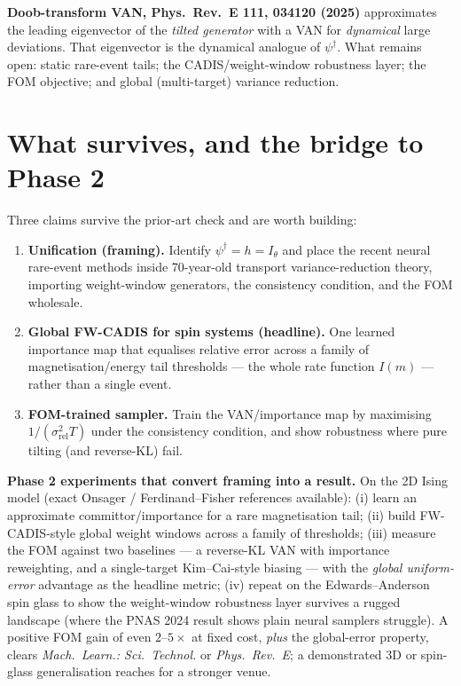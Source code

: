 \documentclass[11pt]{article}
\newcommand{\dg}{^{\dagger}}
\begin{document}
\smallskip
\noindent\textbf{Doob-transform VAN, Phys.\ Rev.\ E \textbf{111}, 034120 (2025)} approximates
the leading eigenvector of the \emph{tilted generator} with a VAN for \emph{dynamical} large
deviations. That eigenvector is the dynamical analogue of $\psi\dg$. What remains open:
static rare-event tails; the CADIS/weight-window robustness layer; the FOM objective; and
global (multi-target) variance reduction.

\section{What survives, and the bridge to Phase 2}
Three claims survive the prior-art check and are worth building:
\begin{enumerate}
\item \textbf{Unification (framing).} Identify $\psi\dg=h=I_\theta$ and place the recent
neural rare-event methods inside 70-year-old transport variance-reduction theory, importing
weight-window generators, the consistency condition, and the FOM wholesale.
\item \textbf{Global FW-CADIS for spin systems (headline).} One learned importance map that
equalises relative error across a family of magnetisation/energy tail thresholds --- the
whole rate function $I(m)$ --- rather than a single event.
\item \textbf{FOM-trained sampler.} Train the VAN/importance map by maximising
$1/(\sigma_{\mathrm{rel}}^2 T)$ under the consistency condition, and show robustness where
pure tilting (and reverse-KL) fail.
\end{enumerate}

\noindent\textbf{Phase 2 experiments that convert framing into a result.} On the 2D Ising
model (exact Onsager / Ferdinand--Fisher references available): (i) learn an approximate
committor/importance for a rare magnetisation tail; (ii) build FW-CADIS-style global weight
windows across a family of thresholds; (iii) measure the FOM against two baselines --- a
reverse-KL VAN with importance reweighting, and a single-target Kim--Cai-style biasing ---
with the \emph{global uniform-error} advantage as the headline metric; (iv) repeat on the
Edwards--Anderson spin glass to show the weight-window robustness layer survives a rugged
landscape (where the PNAS 2024 result shows plain neural samplers struggle). A positive FOM
gain of even $2$--$5\times$ at fixed cost, \emph{plus} the global-error property, clears
\textit{Mach.\ Learn.: Sci.\ Technol.} or \textit{Phys.\ Rev.\ E}; a demonstrated 3D or
spin-glass generalisation reaches for a stronger venue.
\end{document}
